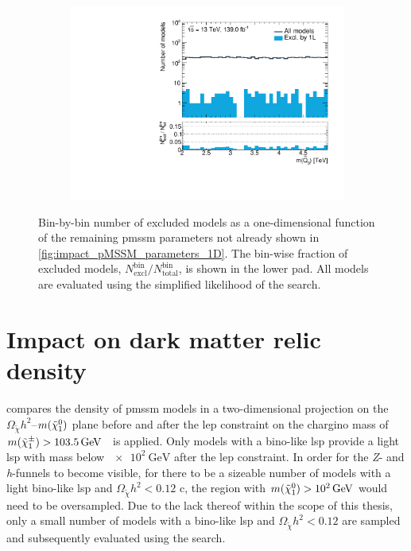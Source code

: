 \begin{figure}
\begin{subfigure}[b]{0.4\linewidth}
	\end{subfigure}
	\begin{subfigure}[b]{0.4\linewidth}
		\centering\includegraphics[width=\textwidth]{1D/mqL3}
	\end{subfigure}
	\caption{Bin-by-bin number of excluded models as a one-dimensional function of the remaining \gls{pmssm} parameters not already shown in \cref{fig:impact_pMSSM_parameters_1D}. The bin-wise fraction of excluded models, $N^\mathrm{bin}_\mathrm{excl} / N^\mathrm{bin}_\mathrm{total}$, is shown in the lower pad. All models are evaluated using the simplified likelihood of the \onelepton search.}
	\label{fig:impact_pMSSM_parameters_1D_2}
\end{figure}


\FloatBarrier

\section{Impact on dark matter relic density}

 compares the density of \gls{pmssm} models in a two-dimensional projection on the $\Omega_{\tilde{\chi}} h^2$--$m(\tilde{\chi}_1^0)$ plane before and after the \gls{lep} constraint on the chargino mass of $m(\charg) > \SI{103.5}{\GeV}$~\cite{lep_susy_results} is applied. Only models with a bino-like \gls{lsp} provide a light \gls{lsp} with mass below $\SI{e2}{\GeV}$ after the \gls{lep} constraint. In order for the \textit{Z}- and \textit{h}-funnels to become visible, \ie for there to be a sizeable number of models with a light bino-like \gls{lsp} and $\Omega_{\tilde{\chi}} h^2 < 0.12$ c, the region with  $m(\lsp) > \SI{e2}{\GeV}$ would need to be oversampled. Due to the lack thereof within the scope of this thesis, only a small number of models with a bino-like \gls{lsp} and $\Omega_{\tilde{\chi}} h^2 < 0.12$ are sampled and subsequently evaluated using the \onelepton search.

